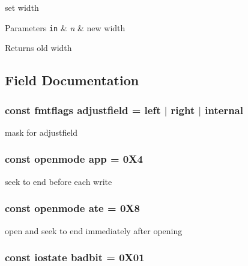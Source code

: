 set width 
\begin{DoxyParams}[1]{Parameters}
\mbox{\tt in}  & {\em n} & new width \\
\hline
\end{DoxyParams}
\begin{DoxyReturn}{Returns}
old width 
\end{DoxyReturn}


\subsection{Field Documentation}
\hypertarget{classios__base_a4beb095a1dc7f3219d75db177f58b688}{
\subsubsection[{adjustfield}]{\setlength{\rightskip}{0pt plus 5cm}const {\bf fmtflags} adjustfield = {\bf left} $|$ {\bf right} $|$ {\bf internal}\hspace{0.3cm}{\ttfamily [static]}}}\label{classios__base_a4beb095a1dc7f3219d75db177f58b688}
mask for adjustfield \hypertarget{classios__base_a64d9d8299325373c7033d9712e25d02c}{
\subsubsection[{app}]{\setlength{\rightskip}{0pt plus 5cm}const {\bf openmode} app = 0\-X4\hspace{0.3cm}{\ttfamily [static]}}}\label{classios__base_a64d9d8299325373c7033d9712e25d02c}
seek to end before each write \hypertarget{classios__base_a237edbe1dd49e5495b99c0aadb6ae2a7}{
\subsubsection[{ate}]{\setlength{\rightskip}{0pt plus 5cm}const {\bf openmode} ate = 0\-X8\hspace{0.3cm}{\ttfamily [static]}}}\label{classios__base_a237edbe1dd49e5495b99c0aadb6ae2a7}
open and seek to end immediately after opening \hypertarget{classios__base_ae1ebed8197a63eab91d0077ced62879d}{
\subsubsection[{badbit}]{\setlength{\rightskip}{0pt plus 5cm}const {\bf iostate} badbit = 0\-X01\hspace{0.3cm}{\ttfamily [static]}}}\label{classios__base_ae1ebed8197a63eab91d0077ced62879d}
